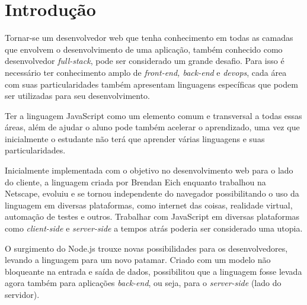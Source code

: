 \documentclass[
	12pt,				%
	openright,			%
	twoside,			%
	a4paper,			%
	english,			%
	brazil				%
	]{abntex2}
\begin{document}

\textual


\chapter{Introdução}
\label{cap:Introducao}

Tornar-se um desenvolvedor web que tenha conhecimento em todas as camadas que envolvem o desenvolvimento de uma aplicação, também conhecido como desenvolvedor \textit{full-stack}, pode ser considerado um grande desafio. Para isso é necessário ter conhecimento amplo de \textit{front-end, back-end} e \textit{devops}, cada área com suas particularidades também apresentam linguagens específicas que podem ser utilizadas para seu desenvolvimento. 

Ter a linguagem JavaScript como um elemento comum e transversal a todas essas áreas, além de ajudar o aluno pode também acelerar o aprendizado, uma vez que inicialmente o estudante não terá que aprender várias linguagens e suas particularidades.

Inicialmente implementada com o objetivo no desenvolvimento web para o lado do cliente, a linguagem criada por Brendan Eich enquanto trabalhou na Netscape, evoluiu e se tornou independente do navegador possibilitando o uso da linguagem em diversas plataformas, como internet das coisas, realidade virtual, automação de testes e outros. Trabalhar com JavaScript em diversas plataformas como \textit{client-side} e \textit{server-side} a tempos atrás poderia ser considerado uma utopia.

O surgimento do Node.js trouxe novas possibilidades para os desenvolvedores, levando a linguagem para um novo patamar. Criado com um modelo não bloqueante na entrada e saída de dados, possibilitou que a linguagem fosse levada agora também para aplicações \textit{back-end}, ou seja, para o \textit{server-side} (lado do servidor).
\end{document}
